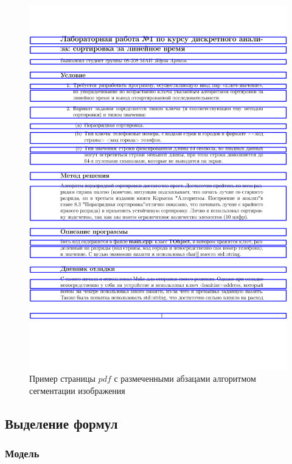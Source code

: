 \begin{figure}
    \includegraphics[scale=0.15]{img/paragraph/pdf_like_img_output.png}
    \caption{Пример страницы $pdf$ с размеченными абзацами алгоритмом сегментации изображения}
    \label{img_segmentation_output_pdf}
\end{figure}


\subsection{Выделение формул}
\subsubsection{Модель}

